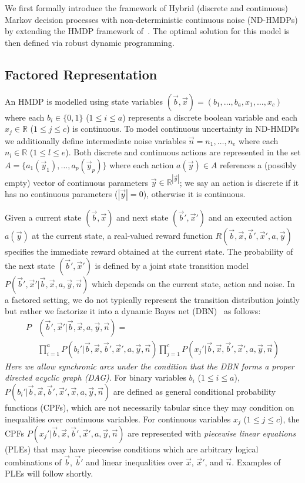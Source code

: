 We first formally introduce the framework of Hybrid (discrete and
continuous) Markov decision processes with non-deterministic
continuous noise (ND-HMDPs) by extending the HMDP framework 
of~\cite{sdp_aaai}. The optimal solution for this model is then defined
via robust dynamic programming.

\subsection{Factored Representation}

An HMDP is modelled using state variables $(\vec{b},\vec{x}) = (
b_1,\ldots,b_a,x_{1},\ldots,x_c )$ where each $b_i \in \{ 0,1 \}$
($1 \leq i \leq a$) represents a discrete boolean variable and
each $x_j \in \mathbb{R}$ ($1 \leq j \leq c$) is continuous.  To model
continuous uncertainty in ND-HMDPs we additionally define intermediate
noise variables $\vec{n} = n_1, \ldots , n_e$ where each
$n_l \in \mathbb{R}$ ($1 \leq l \leq e$).  Both discrete and
continuous actions are represented in the set $A
= \{a_1(\vec{y}_1), \ldots, a_p(\vec{y}_p) \}$ where each action
$a(\vec{y}) \in A$ references a (possibly empty) vector of continuous
parameters $\vec{y} \in \mathbb{R}^{|\vec{y}|}$; we say an action is
discrete if it has no continuous parameters ($|\vec{y}| = 0$), otherwise
it is continuous.

Given a current state $(\vec{b},\vec{x})$ and next state
$(\vec{b}',\vec{x}')$ and an executed action $a(\vec{y})$ 
at the current state, a real-valued reward function $R(\vec{b},\vec{x},\vec{b}',\vec{x}',a,\vec{y})$
specifies the immediate reward obtained at the current state. The probability of the
next state $(\vec{b}',\vec{x}')$ is defined by a joint state
transition model
$P(\vec{b}',\vec{x}'| \vec{b},\vec{x},a,\vec{y},\vec{n})$ which
depends on the current state, action and noise.
In a factored setting, we do not typically represent the transition
distribution jointly but rather we factorize it into a
dynamic Bayes net (DBN)~\cite{} as follows:
{\footnotesize
\begin{align}
P&(\vec{b}',\vec{x}'|\vec{b},\vec{x}, a,\vec{y},\vec{n}) = \nonumber  \\
& \prod_{i=1}^a P(b_i'|\vec{b},\vec{x},\vec{b}',\vec{x}',a,\vec{y},\vec{n}) 
  \prod_{j=1}^c P(x_j'|\vec{b},\vec{x},\vec{b}',\vec{x}',a,\vec{y},\vec{n})
\end{align}
}
\emph{Here we allow synchronic arcs under the condition that the DBN forms
a proper directed acyclic graph (DAG)}.
For binary variables $b_i$ ($1 \leq i \leq a$),
$P(b_i'|\vec{b},\vec{x},\vec{b}',\vec{x}',\vec{x},a,\vec{y},\vec{n})$ are defined as
general conditional probability functions (CPFs), which are not necessarily tabular
since they may condition on inequalities over continuous variables.  For
continuous variables $x_j$ ($1 \leq j \leq c$), the CPFs
$P(x_j'|\vec{b},\vec{x},\vec{b}',\vec{x}',a,\vec{y},\vec{n})$ are represented
with \emph{piecewise linear equations} (PLEs) that may have piecewise 
conditions which are arbitrary logical combinations of
$\vec{b}$, $\vec{b}'$ and linear inequalities over $\vec{x}$, $\vec{x}'$,
and $\vec{n}$.  Examples of PLEs will follow shortly.

